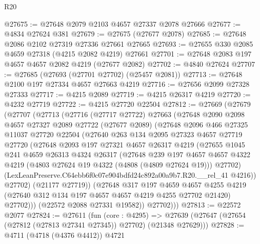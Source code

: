 \begin{lexlean}{R20}
\begin{coremodule}
@27675 := @27648 @2079 @2103 @4657 @27337 @2078 @27666
@27677 := @4834 @27624 @381
@27679 := @27675 (@27677 @2078)
@27685 := @27648 @2086 @2102 @27319 @27336 @27661 @27665
@27693 := @27655 @330 @2085 @4659 @27318 (@4215 @2082 @4219) @27661
@27701 := @27648 @2083 @197 @4657 @4657 @2082 @4219 (@27677 @2082)
@27702 := @4840 @27624
@27707 := @27685 (@27693 (@27701 @27702) (@25457 @2081))
@27713 := @27648 @2100 @197 @27334 @4657 @27663 @4219
@27716 := @27656 @2099 @27328 @27333
@27717 := @4215 @2089
@27719 := @4215 @26317 @4219
@27720 := @4232 @27719
@27722 := @4215 @27720 @22504
@27812 := @27669
    (@27679
      (@27707
        (@27713
          (@27716
            (@27717 @27722)
            @27663
            (@27648
              @2090
              @2098
              @4657
              @27327
              @2089
              @27722
              (@27677 @2089)
              (@27648
                @2096
                @466
                @27325
                @11037
                @27720
                @22504
                (@27640
                  @263
                  @134
                  @2095
                  @27323
                  @4657
                  @27719
                  @27720
                  (@27648
                    @2093
                    @197
                    @27321
                    @4657
                    @26317
                    @4219
                    (@27655
                      @1045
                      @241
                      @4659
                      @26313
                      @4324
                      @26317
                      (@27648
                        @239
                        @197
                        @4657
                        @4657
                        @4322
                        @4219
                        (@4803 @27624 @19 @4322 (@4808 (@4809 @27624 @19)))
                        @27702)
                      (LexLeanPreserve.C64ebb6f0c07e904bdfd24c892a00a9b7.R20.__rel_41 @4216))
                    @27702)
                  (@21177 @27719))
                (@27648
                  @317
                  @197
                  @4659
                  @4657
                  @4255
                  @4219
                  (@27640 @312 @134 @197 @4657 @4657 @4219 @4255 @27702 @21420)
                  @27702)))
            (@22572 @2088 @27331 @19582))
          @27702)))
@27813 := @22572 @2077
@27824 := @27611
    (fun (core : @4295) =>
    @27639 (@27647 (@27654 (@27812 (@27813 @27341 @27345)) @27702) (@21348 @27629)))
@27828 := @4711 (@4718 (@4376 @4412)) @4721

\end{coremodule}
\end{lexlean}
